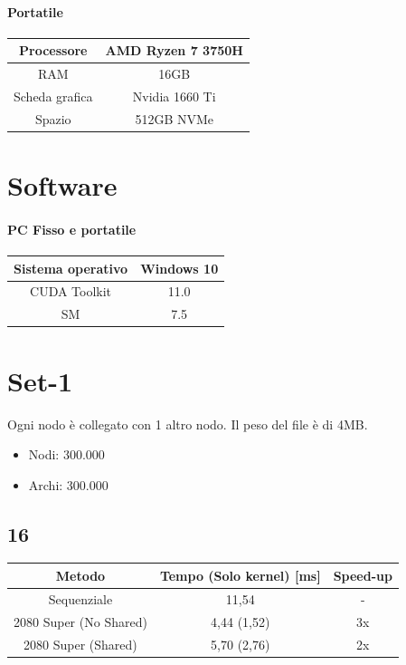 \documentclass[12pt,a4paper]{report}
\begin{document}
		\paragraph{Portatile}
		
			\begin{tabular}{|c|c|}
				\hline
				Processore & AMD Ryzen 7 3750H \\
				\hline
				RAM & 16GB \\
				\hline
				Scheda grafica & Nvidia 1660 Ti \\
				\hline
				Spazio & 512GB NVMe \\
				\hline
			\end{tabular}
		
		\section{Software}
		
			\paragraph{PC Fisso e portatile}
				
				\begin{tabular}{|c|c|}
					\hline
					Sistema operativo & Windows 10 \\
					\hline
					CUDA Toolkit & 11.0 \\
					\hline
					SM & 7.5 \\
					\hline
				\end{tabular}
			
		\section{Set-1}
		
			Ogni nodo è collegato con 1 altro nodo.
			Il peso del file è di 4MB.
		
			\begin{itemize}
				\item Nodi: 300.000
				\item Archi: 300.000
			\end{itemize}
		
		\subsection{16}
		
			\begin{tabular}{|c|c|c|}
				\hline
				Metodo & Tempo (Solo kernel) [ms] & Speed-up \\
				\hline
				Sequenziale & 11,54 & -  \\
				\hline
				2080 Super (No Shared) & 4,44 (1,52) & 3x \\
				\hline
				2080 Super (Shared) & 5,70 (2,76) & 2x \\
				\hline
			\end{tabular}
			
\end{document}

